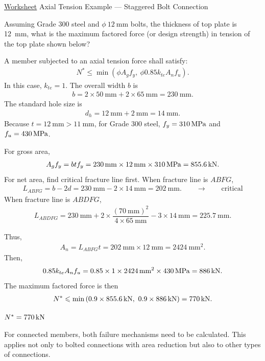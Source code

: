 \begin{exmp}\href{run:./WORKSHEET/CH03/EX3.ATBC.sm}{Worksheet}
Axial Tension Example --- Staggered Bolt Connection

Assuming Grade 300 steel and $\phi~\SI{12}{\mm}$ bolts, the thickness of top plate is \SI{12}{\mm}, what is the maximum factored force (or design strength) in tension of the top plate shown below?
\begin{figure}[H]

\end{figure}
\end{exmp}
\begin{solution}
A member subjected to an axial tension force shall satisfy:
\begin{gather*}
N^*\leqslant\min\left(\phi{}A_gf_y,~\phi{}0.85k_{te}A_nf_u\right).
\end{gather*}
In this case, $k_{te}=1$.
The overall width $b$ is
\begin{gather*}
b=2\times\SI{50}{\mm}+2\times\SI{65}{\mm}=\SI{230}{\mm}.
\end{gather*}
The standard hole size is
\begin{gather*}
d_h=\SI{12}{\mm}+\SI{2}{\mm}=\SI{14}{\mm}.
\end{gather*}
Because $t=\SI{12}{\mm}>\SI{11}{\mm}$, for Grade 300 steel, $f_y=\SI{310}{\mega\pascal}$ and $f_u=\SI{430}{\mega\pascal}$.

For gross area,
\begin{gather*}
A_gf_y=btf_y=\SI{230}{\milli\meter}\times\SI{12}{\milli\meter}\times\SI{310}{\mega\pascal}=\SI{855.6}{\kilo\newton}.
\end{gather*}
For net area, find critical fracture line first.
When fracture line is $ABFG$,
\begin{gather*} L_{ABFG}=b-2d=\SI{230}{\mm}-2\times\SI{14}{\mm}=\SI{202}{\mm}.\qquad\rightarrow\qquad\text{critical}
\end{gather*}
When fracture line is $ABDFG$,
\begin{gather*}
L_{ABDFG}=\SI{230}{\mm}+2\times\dfrac{\left(\SI{70}{\mm}\right)^2}{4\times\SI{65}{\mm}}-3\times\SI{14}{\mm}=\SI{225.7}{\mm}.
\end{gather*}
\begin{figure}[H]\centering
\end{figure}
Thus,
\begin{gather*}
A_n=L_{ABFG}t=\SI{202}{\mm}\times\SI{12}{\mm}=\SI{2424}{\mm^2}.
\end{gather*}
Then,
\begin{gather*}
0.85k_{te}A_nf_u=0.85\times1\times\SI{2424}{\milli\meter^2}\times\SI{430}{\mega\pascal}=\SI{886}{\kilo\newton}.
\end{gather*}
The maximum factored force is then
\begin{gather*}
N^*\leqslant\min\left(0.9\times\SI{855.6}{\kilo\newton},~0.9\times\SI{886}{\kilo\newton}\right)=\SI{770}{\kilo\newton}.
\end{gather*}
\begin{flushright}
$N^*=\SI{770}{\kilo\newton}$
\end{flushright}
\end{solution}
For connected members, both failure mechanisms need to be calculated.
This applies not only to bolted connections with area reduction but also to other types of connections.

